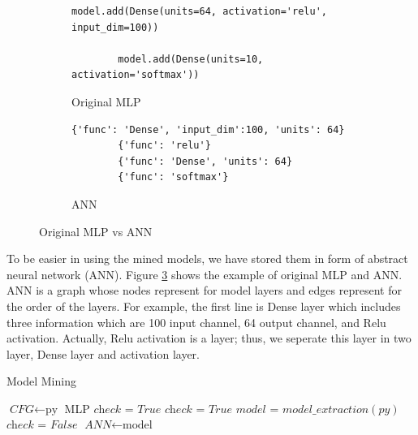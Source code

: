 \begin{figure}
	\centering
	\begin{subfigure}[b]{.45\linewidth}
		\begin{lstlisting}[basicstyle=\tiny,numberblanklines=false]
		model.add(Dense(units=64, activation='relu', input_dim=100)) 
		
		model.add(Dense(units=10, activation='softmax'))
		\end{lstlisting}
		\caption{Original MLP}
		\label{fig:originalCNN}
	\end{subfigure}
	\begin{subfigure}[b]{.45\linewidth}
		\begin{lstlisting}[basicstyle=\tiny,numberblanklines=false]	
		{'func': 'Dense', 'input_dim':100, 'units': 64} 
		{'func': 'relu'}
		{'func': 'Dense', 'units': 64}
		{'func': 'softmax'}
		\end{lstlisting}
		\caption{ANN}
		\label{fig:convertedCNN}
	\end{subfigure}
	\caption{Original MLP vs ANN}
	\label{fig:converted}
\end{figure}



To be easier in using the mined models, we have stored them in form of abstract neural network (ANN). Figure \ref{fig:converted} shows the example of original MLP and ANN. ANN is a graph whose nodes represent for model layers and edges represent for the order of the layers. For example, the first line is Dense layer which includes three information which are 100 input channel, 64 output channel, and Relu activation. Actually, Relu activation is a layer; thus, we seperate this layer in two layer, Dense layer and activation layer.
\begin{algorithm}
	\caption{Model Mining}\label{euclid}
	\begin{algorithmic}[1]
			\State $\textit{CFG} \gets \text{py}$
			\State \Return MLP
		\EndProcedure
		\State $\textit{check = True} $
			\State $\textit{check = True} $
			\State $model$ = $model\_extraction(py)$ 
					\State $\textit{check = False} $
				\EndIf
			\EndFor
				\State $\textit{ANN}  \gets \text{model}$
			\EndIf
		\EndFor
		
		\EndProcedure	
	\end{algorithmic}
\end{algorithm}


